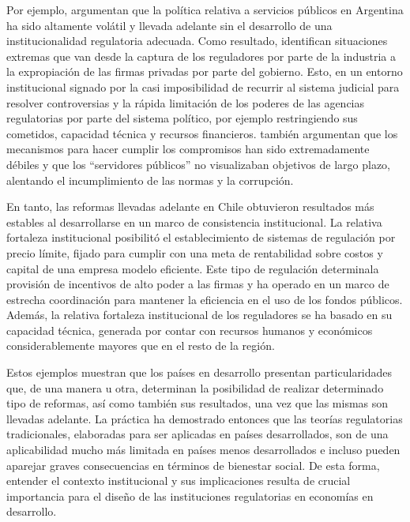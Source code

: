 \documentclass[
  12pt,
  spanish,
]{book}
\begin{document}
Por ejemplo, \citet{Bergara2005} argumentan que la política relativa a
servicios públicos en Argentina ha sido altamente volátil y llevada
adelante sin el desarrollo de una institucionalidad regulatoria
adecuada. Como resultado, identifican situaciones extremas que van desde
la captura de los reguladores por parte de la industria a la
expropiación de las firmas privadas por parte del gobierno. Esto, en un
entorno institucional signado por la casi imposibilidad de recurrir al
sistema judicial para resolver controversias y la rápida limitación de
los poderes de las agencias regulatorias por parte del sistema político,
por ejemplo restringiendo sus cometidos, capacidad técnica y recursos
financieros. \citet{Spiller2003} también argumentan que los mecanismos
para hacer cumplir los compromisos han sido extremadamente débiles y que
los ``servidores públicos'' no visualizaban objetivos de largo plazo,
alentando el incumplimiento de las normas y la corrupción.

En tanto, las reformas llevadas adelante en Chile obtuvieron resultados
más estables al desarrollarse en un marco de consistencia institucional.
La relativa fortaleza institucional posibilitó el establecimiento de
sistemas de regulación por precio límite, fijado para cumplir con una
meta de rentabilidad sobre costos y capital de una empresa modelo
eficiente. Este tipo de regulación determinala provisión de incentivos
de alto poder a las firmas y ha operado en un marco de estrecha
coordinación para mantener la eficiencia en el uso de los fondos
públicos. Además, la relativa fortaleza institucional de los reguladores
se ha basado en su capacidad técnica, generada por contar con recursos
humanos y económicos considerablemente mayores que en el resto de la
región.

Estos ejemplos muestran que los países en desarrollo presentan
particularidades que, de una manera u otra, determinan la posibilidad de
realizar determinado tipo de reformas, así como también sus resultados,
una vez que las mismas son llevadas adelante. La práctica ha demostrado
entonces que las teorías regulatorias tradicionales, elaboradas para ser
aplicadas en países desarrollados, son de una aplicabilidad mucho más
limitada en países menos desarrollados e incluso pueden aparejar graves
consecuencias en términos de bienestar social. De esta forma, entender
el contexto institucional y sus implicaciones resulta de crucial
importancia para el diseño de las instituciones regulatorias en
economías en desarrollo.
\end{document}
